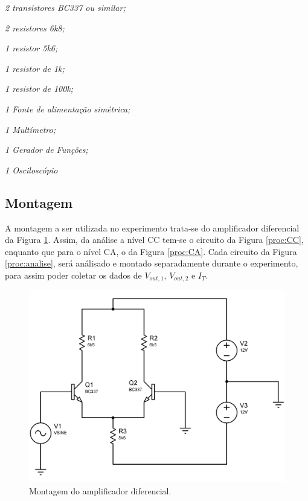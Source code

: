 \documentclass[a4paper,12pt,oneside,openany,table,xcdraw]{article}
\begin{document}
\singlespacing
\begin{itemize}
\begin{multicols}{2}
\item \emph{2 transistores BC337 ou similar;}
\item \emph{2 resistores 6k8;}
\item \emph{1 resistor 5k6;}
\item \emph{1 resistor de 1k;}
\item \emph{1 resistor de 100k;}\columnbreak

\item \emph{1 Fonte de alimentação simétrica;}
\item \emph{1 Multímetro;}
\item \emph{1 Gerador de Funções;}
\item \emph{1 Osciloscópio}
\end{multicols}

\end{itemize}
\onehalfspacing

\vspace{0.2cm}
\subsection{Montagem} %
A montagem a ser utilizada no experimento trata-se do amplificador diferencial da Figura \ref{proc:montagem}. Assim, da análise a nível CC tem-se o circuito da Figura \ref{proc:CC}, enquanto que para o nível CA, o da Figura \ref{proc:CA}. Cada circuito da Figura \ref{proc:analise}, será análisado e montado separadamente durante o experimento, para assim poder coletar os dados de $V_{out, 1}$, $V_{out, 2}$ e $I_{T}$.

\vspace{0.3cm}
\begin{figure}[H]
\centering
\includegraphics[width=13cm]{montagem}
\caption{Montagem do amplificador diferencial.}
\label{proc:montagem}
\end{figure}
\vspace{0.5cm}
\end{document}
